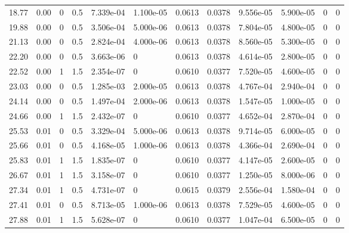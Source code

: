 \documentclass[preview]{standalone}
\begin{document}
{{\begin{tabular}{L{1.2cm}C{1.2cm} C{0.3cm}C{0.5cm} C{1.4cm}C{1.4cm} C{1.4cm}C{1.4cm} C{1.6cm}C{1.6cm} C{1.6cm}C{1.6cm}}
  18.77  &  0.00  & 0     & 0.5 &  7.339e-04  & 1.100e-05  &  0.0613&   0.0378& 9.556e-05 & 5.900e-05   &  0 & 0  \\ 
  19.88  &  0.00  & 0     & 0.5 &  3.506e-04  & 5.000e-06  &  0.0613&   0.0378& 7.804e-05 & 4.800e-05   &  0 & 0  \\ 
  21.13  &  0.00  & 0     & 0.5 &  2.824e-04  & 4.000e-06  &  0.0613&   0.0378& 8.560e-05 & 5.300e-05   &  0 & 0  \\ 
  22.20  &  0.00  & 0     & 0.5 &  3.663e-06  & 0  &  0.0613&   0.0378& 4.614e-05 & 2.800e-05   &  0 & 0  \\ 
  22.52  &  0.00  & 1     & 1.5 &  2.354e-07  & 0  &  0.0610&   0.0377& 7.520e-05 & 4.600e-05   &  0 & 0  \\ 
  23.03  &  0.00  & 0     & 0.5 &  1.285e-03  & 2.000e-05  &  0.0613&   0.0378& 4.767e-04 & 2.940e-04   &  0 & 0  \\ 
  24.14  &  0.00  & 0     & 0.5 &  1.497e-04  & 2.000e-06  &  0.0613&   0.0378& 1.547e-05 & 1.000e-05   &  0 & 0  \\ 
  24.66  &  0.00  & 1     & 1.5 &  2.432e-07  & 0  &  0.0610&   0.0377& 4.652e-04 & 2.870e-04   &  0 & 0  \\ 
  25.53  &  0.01  & 0     & 0.5 &  3.329e-04  & 5.000e-06  &  0.0613&   0.0378& 9.714e-05 & 6.000e-05   &  0 & 0  \\ 
  25.66  &  0.01  & 0     & 0.5 &  4.168e-05  & 1.000e-06  &  0.0613&   0.0378& 4.366e-04 & 2.690e-04   &  0 & 0  \\ 
  25.83  &  0.01  & 1     & 1.5 &  1.835e-07  & 0  &  0.0610&   0.0377& 4.147e-05 & 2.600e-05   &  0 & 0  \\ 
  26.67  &  0.01  & 1     & 1.5 &  3.158e-07  & 0  &  0.0610&   0.0377& 1.250e-05 & 8.000e-06   &  0 & 0  \\ 
  27.34  &  0.01  & 1     & 0.5 &  4.731e-07  & 0  &  0.0615&   0.0379& 2.556e-04 & 1.580e-04   &  0 & 0  \\ 
  27.41  &  0.01  & 0     & 0.5 &  8.713e-05  & 1.000e-06  &  0.0613&   0.0378& 7.529e-05 & 4.600e-05   &  0 & 0  \\ 
  27.88  &  0.01  & 1     & 1.5 &  5.628e-07  & 0  &  0.0610&   0.0377& 1.047e-04 & 6.500e-05   &  0 & 0  \\ 
\hline 
\end{tabular} 

}}
\end{document}
